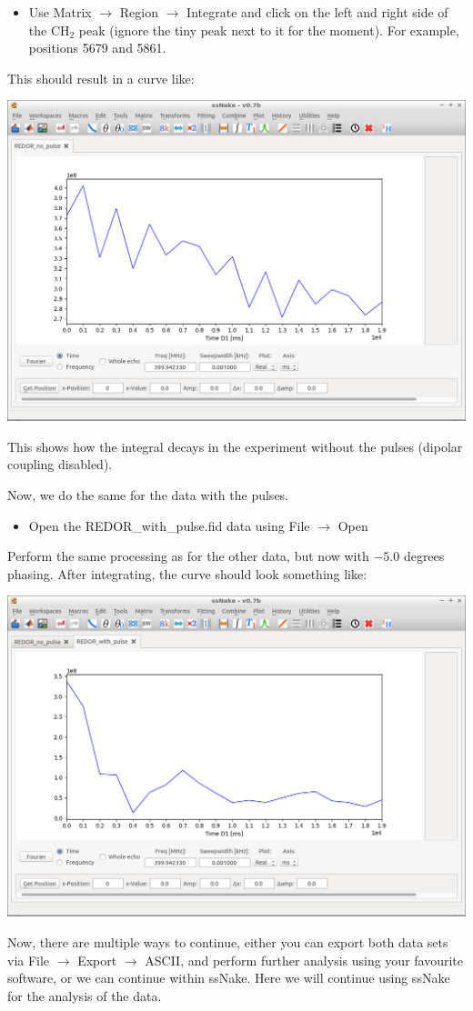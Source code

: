 \documentclass[11pt,a4paper]{article}
\begin{document}
\begin{itemize}
\item Use Matrix $\longrightarrow$ Region $\longrightarrow$ Integrate and click on the left and right side of the CH$_2$ peak (ignore the tiny peak next to it for the moment). For example, positions 5679 and 5861.
\end{itemize}
This should result in a curve like:
\begin{center}
\includegraphics[width=0.8\linewidth]{Figs/Fig2.png}
\end{center}
This shows how the integral decays in the experiment without the pulses (dipolar coupling disabled).

Now, we do the same for the data with the pulses. 
\begin{itemize}
\item Open the REDOR\_with\_pulse.fid data using File $\longrightarrow$ Open
\end{itemize}
Perform the same processing as for the other data, but now with $-5.0$ degrees phasing.
After integrating, the curve should look something like:
\begin{center}
\includegraphics[width=0.8\linewidth]{Figs/Fig3.png}
\end{center}
Now, there are multiple ways to continue, either you can export both data sets via File $\longrightarrow$ Export  $\longrightarrow$ ASCII, and perform further analysis using your favourite software, or we can continue within ssNake.
Here we will continue using ssNake for the analysis of the data.
\end{document}
